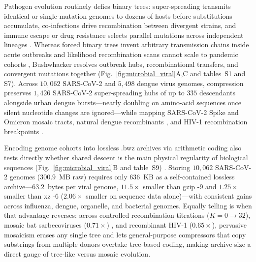 \documentclass[12pt]{article}
\begin{document}
Pathogen evolution routinely defies binary trees: super-spreading transmits identical or single-mutation genomes to dozens of hosts before substitutions accumulate, co-infections drive recombination between divergent strains, and immune escape or drug resistance selects parallel mutations across independent lineages \cite{worobey1999widespread,turakhia2022pandemic}. Whereas forced binary trees invent arbitrary transmission chains inside acute outbreaks and likelihood recombination scans cannot scale to pandemic cohorts \cite{kosakovskypond2006gard}, Bushwhacker resolves outbreak hubs, recombinational transfers, and convergent mutations together (Fig.~\ref{fig:microbial_viral}A,C and tables~S1 and S7). Across $10,062$ SARS-CoV-2 and $5,498$ dengue virus genomes, compression preserves $1,426$ SARS-CoV-2 super-spreading hubs of up to $335$ descendants alongside urban dengue bursts---nearly doubling on amino-acid sequences once silent nucleotide changes are ignored---while mapping SARS-CoV-2 Spike and Omicron mosaic tracts, natural dengue recombinants \cite{worobey1999widespread}, and HIV-1 recombination breakpoints \cite{methods}.

Encoding genome cohorts into lossless .bwz archives via arithmetic coding also tests directly whether shared descent is the main physical regularity of biological sequences (Fig.~\ref{fig:microbial_viral}B and table~S9) \cite{methods}. Storing $10,062$ SARS-CoV-2 genomes ($300.9$~MB raw) requires only $636$~KB as a self-contained lossless archive---$63.2$~bytes per viral genome, $11.5\times$ smaller than gzip -9 and $1.25\times$ smaller than xz -6 ($2.06\times$ smaller on sequence data alone)---with consistent gains across influenza, dengue, organelle, and bacterial genomes. Equally telling is when that advantage reverses: across controlled recombination titrations ($K = 0 \to 32$), mosaic bat sarbecoviruses ($0.71\times$) \cite{lytras2022exploring}, and recombinant HIV-1 ($0.65\times$), pervasive mosaicism erases any single tree and lets general-purpose compressors that copy substrings from multiple donors overtake tree-based coding, making archive size a direct gauge of tree-like versus mosaic evolution.
\end{document}
